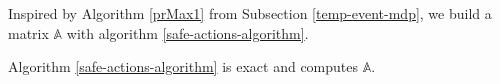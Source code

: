 
\noindent Inspired by Algorithm \ref{prMax1} from Subsection \ref{temp-event-mdp}, we build a matrix $\mathbb{A}$ with algorithm \ref{safe-actions-algorithm}.



\begin{lemma}
  Algorithm \ref{safe-actions-algorithm} is exact and computes $\mathbb{A}$.
\end{lemma}

